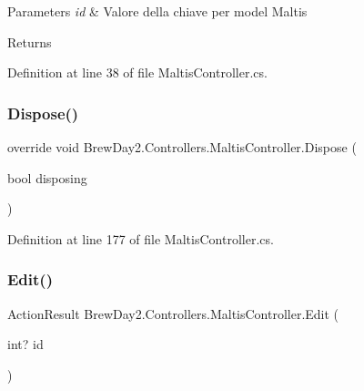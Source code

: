 \begin{DoxyParams}{Parameters}
{\em id} & Valore della chiave per model Maltis\\
\hline
\end{DoxyParams}
\begin{DoxyReturn}{Returns}

\end{DoxyReturn}


Definition at line 38 of file Maltis\+Controller.\+cs.

\mbox{\label{class_brew_day2_1_1_controllers_1_1_maltis_controller_a3a721faa697fca3cbac0282df0a23843}} 
\subsubsection{\texorpdfstring{Dispose()}{Dispose()}}
{\footnotesize\ttfamily override void Brew\+Day2.\+Controllers.\+Maltis\+Controller.\+Dispose (\begin{DoxyParamCaption}\item[{bool}]{disposing }\end{DoxyParamCaption})\hspace{0.3cm}{\ttfamily [protected]}}



Definition at line 177 of file Maltis\+Controller.\+cs.

\mbox{\label{class_brew_day2_1_1_controllers_1_1_maltis_controller_ae5e372d2e9a301d3028696daa2e0b182}} 
\subsubsection{\texorpdfstring{Edit()}{Edit()}\hspace{0.1cm}{\footnotesize\ttfamily [1/2]}}
{\footnotesize\ttfamily Action\+Result Brew\+Day2.\+Controllers.\+Maltis\+Controller.\+Edit (\begin{DoxyParamCaption}\item[{int?}]{id }\end{DoxyParamCaption})}



